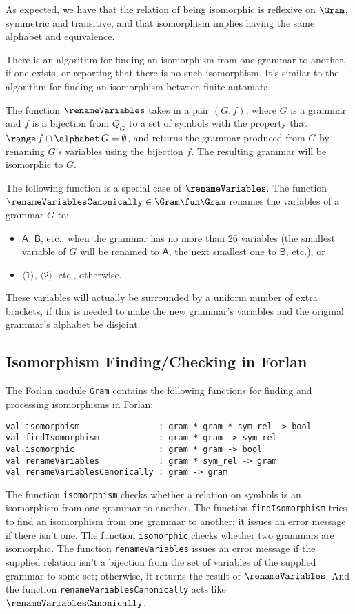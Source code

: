 As expected, we have that the relation of being isomorphic is
reflexive on $\Gram$, symmetric and transitive, and that isomorphism
implies having the same alphabet and equivalence.

There is an algorithm for finding an isomorphism from one grammar to
another, if one exists, or reporting that there is no such
isomorphism.  It's similar to the algorithm for finding an isomorphism
between finite automata.

The function $\renameVariables$ takes in a pair $(G,f)$, where $G$ is
a grammar and $f$ is a bijection from $Q_G$ to a set of symbols with
the property that $\range\,f\cap\alphabet\,G=\emptyset$, and returns
the grammar produced from $G$ by renaming $G$'s variables using the
bijection $f$.  The resulting grammar will be isomorphic to $G$.

The following function is a special case of $\renameVariables$.
The function $\renameVariablesCanonically\in\Gram\fun\Gram$ renames the
variables of a grammar $G$ to:
\begin{itemize}
\item $\mathsf{A}$, $\mathsf{B}$, etc., when the grammar has no more
  than 26 variables (the smallest variable of $G$ will be renamed to
  $\mathsf{A}$, the next smallest one to $\mathsf{B}$, etc.); or

\item $\mathsf{\langle 1\rangle}$, $\mathsf{\langle 2\rangle}$, etc.,
  otherwise.
\end{itemize}
These variables will actually be surrounded by a uniform number of
extra brackets, if this is needed to make the new grammar's variables
and the original grammar's alphabet be disjoint.

\subsection{Isomorphism Finding/Checking in Forlan}

The Forlan module \texttt{Gram} contains the following functions
for finding and processing isomorphisms in Forlan:
\begin{verbatim}
val isomorphism                : gram * gram * sym_rel -> bool
val findIsomorphism            : gram * gram -> sym_rel
val isomorphic                 : gram * gram -> bool
val renameVariables            : gram * sym_rel -> gram
val renameVariablesCanonically : gram -> gram
\end{verbatim}
The function \texttt{isomorphism} checks whether a relation on symbols
is an isomorphism from one grammar to another.  The function
\texttt{findIsomorphism} tries to find an isomorphism from one grammar
to another; it issues an error message if there isn't one.  The
function \texttt{isomorphic} checks whether two grammars are
isomorphic.  The function \texttt{renameVariables} issues an error
message if the supplied relation isn't a bijection from the set of
variables of the supplied grammar to some set; otherwise, it returns
the result of $\renameVariables$.  And the function
\texttt{renameVariablesCanonically} acts like
$\renameVariablesCanonically$.

